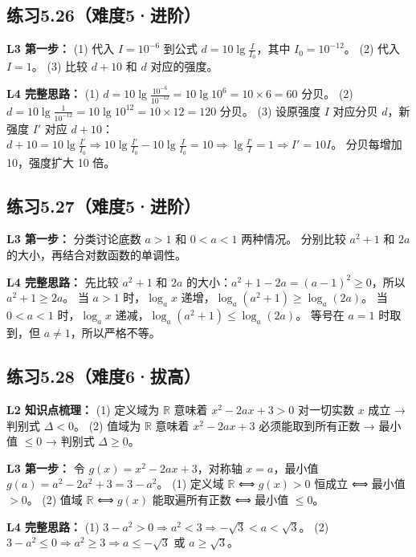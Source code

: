 \subsection*{练习5.26（难度5·进阶）}

\textbf{L3 第一步：}
(1) 代入 \(I = 10^{-6}\) 到公式 \(d = 10\lg\frac{I}{I_0}\)，其中 \(I_0 = 10^{-12}\)。
(2) 代入 \(I = 1\)。
(3) 比较 \(d+10\) 和 \(d\) 对应的强度。

\textbf{L4 完整思路：}
(1) \(d = 10\lg\frac{10^{-6}}{10^{-12}} = 10\lg 10^6 = 10 \times 6 = 60\) 分贝。
(2) \(d = 10\lg\frac{1}{10^{-12}} = 10\lg 10^{12} = 10 \times 12 = 120\) 分贝。
(3) 设原强度 \(I\) 对应分贝 \(d\)，新强度 \(I'\) 对应 \(d+10\)：
\(d+10 = 10\lg\frac{I'}{I_0} \Rightarrow 10\lg\frac{I'}{I_0} - 10\lg\frac{I}{I_0} = 10 \Rightarrow \lg\frac{I'}{I} = 1 \Rightarrow I' = 10I\)。
分贝每增加 10，强度扩大 10 倍。

\subsection*{练习5.27（难度5·进阶）}

\textbf{L3 第一步：}
分类讨论底数 \(a > 1\) 和 \(0 < a < 1\) 两种情况。
分别比较 \(a^2 + 1\) 和 \(2a\) 的大小，再结合对数函数的单调性。

\textbf{L4 完整思路：}
先比较 \(a^2 + 1\) 和 \(2a\) 的大小：\(a^2 + 1 - 2a = (a-1)^2 \ge 0\)，所以 \(a^2 + 1 \ge 2a\)。
当 \(a > 1\) 时，\(\log_a x\) 递增，\(\log_a(a^2+1) \ge \log_a(2a)\)。
当 \(0 < a < 1\) 时，\(\log_a x\) 递减，\(\log_a(a^2+1) \le \log_a(2a)\)。
等号在 \(a = 1\) 时取到，但 \(a \neq 1\)，所以严格不等。

\subsection*{练习5.28（难度6·拔高）}

\textbf{L2 知识点梳理：}
(1) 定义域为 \(\mathbb{R}\) 意味着 \(x^2 - 2ax + 3 > 0\) 对一切实数 \(x\) 成立 → 判别式 \(\Delta < 0\)。
(2) 值域为 \(\mathbb{R}\) 意味着 \(x^2 - 2ax + 3\) 必须能取到所有正数 → 最小值 \(\le 0\) → 判别式 \(\Delta \ge 0\)。

\textbf{L3 第一步：}
令 \(g(x) = x^2 - 2ax + 3\)，对称轴 \(x = a\)，最小值 \(g(a) = a^2 - 2a^2 + 3 = 3 - a^2\)。
(1) 定义域 \(\mathbb{R}\) ⟺ \(g(x) > 0\) 恒成立 ⟺ 最小值 \(> 0\)。
(2) 值域 \(\mathbb{R}\) ⟺ \(g(x)\) 能取遍所有正数 ⟺ 最小值 \(\le 0\)。

\textbf{L4 完整思路：}
(1) \(3 - a^2 > 0 \Rightarrow a^2 < 3 \Rightarrow -\sqrt{3} < a < \sqrt{3}\)。
(2) \(3 - a^2 \le 0 \Rightarrow a^2 \ge 3 \Rightarrow a \le -\sqrt{3}\) 或 \(a \ge \sqrt{3}\)。


